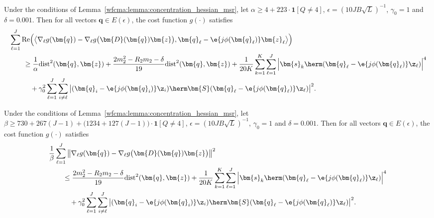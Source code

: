 \begin{lem} \label{wfcma:lem:lcc_msr}
Under the conditions of Lemma~\ref{wfcma:lemma:concentration_hessian_msr}, let $\alpha\geq4+223\cdot\bm{1}[Q\neq4]$, $\epsilon=(10JB\sqrt{L})^{-1}$, $\gamma_0=1$ and $\delta=0.001$. Then for all vectors $\bm{q}\in E(\epsilon)$, the cost function $g(\cdot)$ satisfies
\begin{align}
	&\sum_{\ell=1}^J\mathrm{Re}\Big( \big\langle\nabla_{\ell} g(\bm{q})-\nabla_{\ell} g\big(\bm{D}(\bm{q})\bm{z}\big), \bm{q}_{\ell} - \e{j\phi(\bm{q}_{\ell})}\bm{z}_{\ell}\big\rangle\Big) \nonumber\\
	&\qquad\geq\frac{1}{\alpha}\mathrm{dist}^2(\bm{q},\bm{z})+\frac{2  m_2^2-R_2  m_2-\delta}{19}\mathrm{dist}^2(\bm{q},\bm{z}) 
	+ \frac{1}{20 K}\sum_{k=1}^K\sum_{\ell=1}^J \Big|\bm{s}_k\herm(\bm{q}_{\ell} - \e{j\phi(\bm{q}_{\ell})}\z_{\ell})\Big|^4
	\nonumber\\&\qquad\quad
	+\gamma_0^2\sum_{\ell=1}^J\sum_{i\neq \ell}^J\big|(\bm{q}_i - \e{j\phi(\bm{q}_i)}\z_i)\herm\bm{S}(\bm{q}_{\ell} - \e{j\phi(\bm{q}_{\ell})}\z_{\ell})\big|^2.\label{wfcma:eqn:llc_msr}
\end{align}  
\end{lem}

\begin{lem} \label{wfcma:lem:lsc_msr}
Under the conditions of Lemma~\ref{wfcma:lemma:concentration_hessian_msr}, let  $\beta\geq 730+267(J-1)+\big(1234+127(J-1)\big)\cdot\bm{1}[Q\neq4]$, $\epsilon=(10JB\sqrt{L})^{-1}$, $\gamma_0=1$ and $\delta=0.001$. Then for all vectors $\bm{q}\in E(\epsilon)$, the cost function $g(\cdot)$ satisfies
\begin{align}
	&\frac{1}{\beta}\sum_{\ell=1}^J\big\|\nabla_{\ell} g(\bm{q})-\nabla_{\ell} g\big(\bm{D}(\bm{q})\bm{z}\big)\big\|^2
	\nonumber\\&\qquad
	\leq \frac{2  m_2^2-R_2  m_2-\delta}{19}\mathrm{dist}^2(\bm{q},\bm{z})
	+ \frac{1}{20 K}\sum_{k=1}^K\sum_{\ell=1}^J \Big|\bm{s}_k\herm(\bm{q}_{\ell} - \e{j\phi(\bm{q}_{\ell})}\z_{\ell})\Big|^4
	\nonumber\\&\qquad\quad
	+\gamma_0^2\sum_{\ell=1}^J\sum_{i\neq \ell}^J\big|(\bm{q}_i - \e{j\phi(\bm{q}_i)}\z_i)\herm\bm{S}(\bm{q}_{\ell} - \e{j\phi(\bm{q}_{\ell})}\z_{\ell})\big|^2. \label{wfcma:eqn:lsc_msr}
\end{align}
\end{lem}

